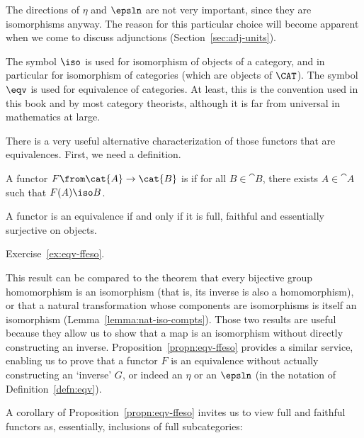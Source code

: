 The directions of $\eta$ and $\epsln$ are not very important, since they
are isomorphisms anyway.  The reason for this particular choice will become
apparent when we come to discuss adjunctions (Section~\ref{sec:adj-units}).

\begin{warning}
The symbol $\iso$ is used for isomorphism of objects of a category, and in
particular for isomorphism of categories (which are objects of $\CAT$).
The symbol $\eqv$ is used for equivalence of categories.  At least, this is
the convention used in this book and by most category theorists, although
it is far from universal in mathematics at large.
\end{warning}

There is a very useful alternative characterization of those functors that
are equivalences.  First, we need a definition.

\begin{defn} 
A functor $F\from \cat{A} \to \cat{B}$ is  if for all $B \in \cat{B}$, there exists $A \in
\cat{A}$ such that $F(A) \iso B$.
\end{defn}

\begin{propn}   
\label{propn:eqv-ffeso}
A functor is an equivalence if and only if it is full, faithful and
essentially surjective on objects.
\end{propn}

\begin{pf}
Exercise~\ref{ex:eqv-ffeso}.
\end{pf}

This result can be compared to the theorem that every bijective group
homomorphism is an isomorphism (that is, its inverse is also a
homomorphism), or that a natural transformation whose components are
isomorphisms is itself an isomorphism (Lemma~\ref{lemma:nat-iso-compts}).
Those two results are useful because they allow us to show that a map is an
isomorphism without directly constructing an inverse.
Proposition~\ref{propn:eqv-ffeso} provides a similar service, enabling us
to prove that a functor $F$ is an equivalence without actually constructing
an `inverse' $G$, or indeed an $\eta$ or an $\epsln$ (in the notation of
Definition~\ref{defn:eqv}).

A corollary of Proposition~\ref{propn:eqv-ffeso} invites us to view full
and faithful%
%
%
functors as, essentially, inclusions of full subcategories:

